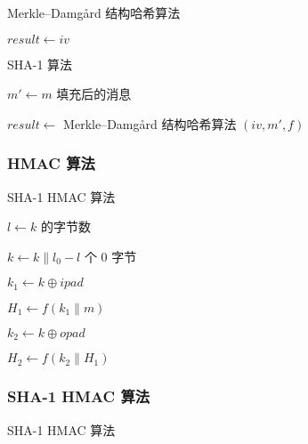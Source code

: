 \documentclass[12pt,a4paper]{article}
\begin{document}
\begin{algorithm}[H]
\caption{Merkle–Damgård 结构哈希算法}

$ {result} \leftarrow {iv} $


\end{algorithm}

\begin{algorithm}[H]
\caption{SHA-1 算法}

$ m' \leftarrow m $ 填充后的消息

$ {result} \leftarrow $ Merkle–Damgård 结构哈希算法 $ ({iv}, m', f) $

\end{algorithm}

\subsubsection*{HMAC 算法}

\begin{algorithm}[H]
\caption{SHA-1 HMAC 算法}

$ l \leftarrow k $ 的字节数


$ k \leftarrow k \parallel l_0 - l $ 个 $ 0 $ 字节

$ k_1 \leftarrow k \oplus ipad $

$ H_1 \leftarrow f(k_1 \parallel m) $

$ k_2 \leftarrow k \oplus opad $

$ H_2 \leftarrow f(k_2 \parallel H_1) $

\end{algorithm}

\subsubsection*{SHA-1 HMAC 算法}

\begin{algorithm}[H]
\caption{SHA-1 HMAC 算法}

\end{algorithm}
\end{document}

